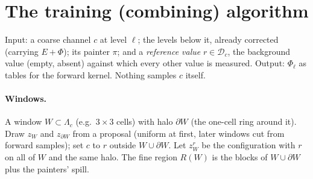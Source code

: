 \documentclass[11pt]{article}
\newcommand{\1}{\mathds{1}}
\newcommand{\Dom}{\mathcal{D}}
\begin{document}
\section{The training (combining) algorithm}
\label{sec:train}

Input: a coarse channel $c$ at level $\ell$; the levels below it, already corrected (carrying
$E + \Phi$); its painter $\pi$; and a \emph{reference value} $r \in \Dom_c$, the background
value (empty, absent) against which every other value is measured. Output: $\Phi_\ell$ as tables
for the forward kernel. Nothing samples $c$ itself.

\paragraph{Windows.} A window $W \subset \Lambda_c$ (e.g.\ $3 \times 3$ cells) with halo
$\partial W$ (the one-cell ring around it). Draw $z_W$ and $z_{\partial W}$ from a proposal
(uniform at first, later windows cut from forward samples); set $c$ to $r$ outside
$W \cup \partial W$. Let $z^{r}_W$ be the configuration with $r$ on all of $W$ and the same
halo. The fine region $R(W)$ is the blocks of $W \cup \partial W$ plus the painters' spill.
\end{document}
